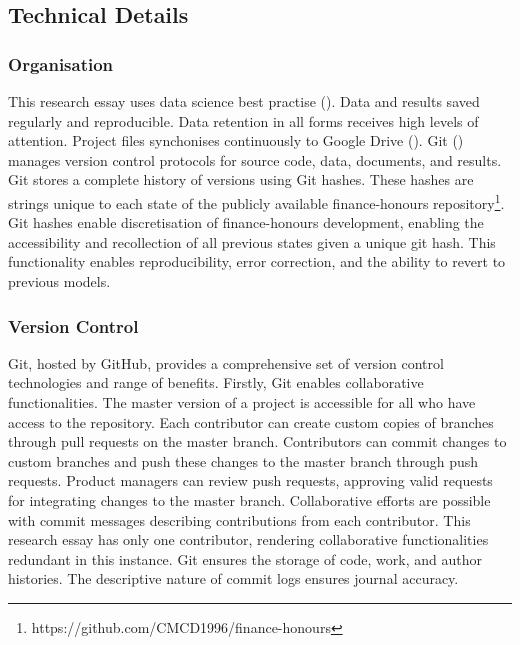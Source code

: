 \documentclass[10pt]{article}
\begin{document}
\subsection{Technical Details}
\subsubsection{Organisation}
This research essay uses data science best practise (\cite{J:10}).
Data and results saved regularly and reproducible. 
Data retention in all forms receives high levels of attention. 
Project files synchonises continuously to Google Drive (\cite{Google_Drive}). 
Git (\cite{Git}) manages version control protocols for source code, data, documents, and results.
Git stores a complete history of versions using Git hashes. 
These hashes are strings unique to each state of the publicly available finance-honours repository\footnote[1]{https://github.com/CMCD1996/finance-honours}. 
Git hashes enable discretisation of finance-honours development, enabling the accessibility and recollection of all previous states given a unique git hash. 
This functionality enables reproducibility, error correction, and the ability to revert to previous models.

\subsubsection{Version Control}\label{Version Control}
Git, hosted by GitHub, provides a comprehensive set of version control technologies and range of benefits.
Firstly, Git enables collaborative functionalities. 
The master version of a project is accessible for all who have access to the repository. 
Each contributor can create custom copies of branches through pull requests on the master branch. 
Contributors can commit changes to custom branches and push these changes to the master branch through push requests. 
Product managers can review push requests, approving valid requests for integrating changes to the master branch. 
Collaborative efforts are possible with commit messages describing contributions from each contributor. 
This research essay has only one contributor, rendering collaborative functionalities redundant in this instance.
Git ensures the storage of code, work, and author histories.
The descriptive nature of commit logs ensures journal accuracy.
\end{document}
